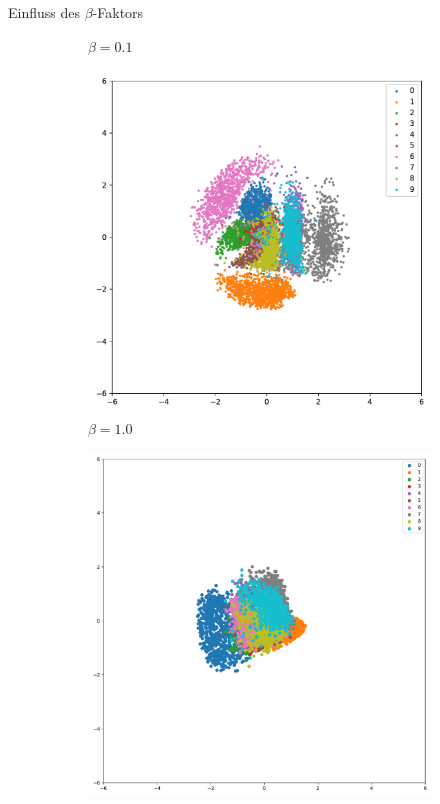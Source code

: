 \documentclass[10pt, compress]{beamer}
\begin{document}
\begin{frame}{Einfluss des $\beta$-Faktors}
\begin{minipage}[c]{\textwidth}
\begin{figure}[hbt]
\begin{subfigure}{.24\textwidth}
  \caption{$\beta = 0.1$}
\end{subfigure}
\begin{subfigure}{.24\textwidth}
  \centering
  \includegraphics[width=\textwidth]{gfx/evaluation/feature_space/beta=1.0.pdf}
  \caption{$\beta = 1.0$}
\end{subfigure}
\begin{subfigure}{.24\textwidth}
  \centering
  \includegraphics[width=\textwidth]{gfx/evaluation/feature_space/beta=10.0.pdf}

\end{subfigure}
\end{figure}
\end{minipage}
\end{frame}
\end{document}
